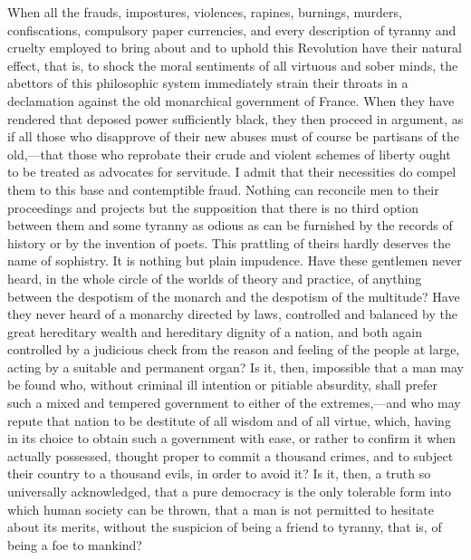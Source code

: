 When all the frauds, impostures, violences, rapines, burnings, murders, confiscations, compulsory paper currencies, and every description of tyranny and cruelty employed to bring about and to uphold this Revolution have their natural effect, that is, to shock the moral sentiments of all virtuous and sober minds, the abettors of this philosophic system immediately strain their throats in a declamation against the old monarchical government of France. When they have rendered that deposed power sufficiently black, they then proceed in argument, as if all those who disapprove of their new abuses must of course be partisans of the old,—that those who reprobate their crude and violent schemes of liberty ought to be treated as advocates for servitude. I admit that their necessities do compel them to this base and contemptible fraud. Nothing can reconcile men to their proceedings and projects but the supposition that there is no third option between them and some tyranny as odious as can be furnished by the records of history or by the invention of poets. This prattling of theirs hardly deserves the name of sophistry. It is nothing but plain impudence. Have these gentlemen never heard, in the whole circle of the worlds of theory and practice, of anything between the despotism of the monarch and the despotism of the multitude? Have they never heard of a monarchy directed by laws, controlled and balanced by the great hereditary wealth and hereditary dignity of a nation, and both again controlled by a judicious check from the reason and feeling of the people at large, acting by a suitable and permanent organ? Is it, then, impossible that a man may be found who, without criminal ill intention or pitiable absurdity, shall prefer such a mixed and tempered government to either of the extremes,—and who may repute that nation to be destitute of all wisdom and of all virtue, which, having in its choice to obtain such a government with ease, or rather to confirm it when actually possessed, thought proper to commit a thousand crimes, and to subject their country to a thousand evils, in order to avoid it? Is it, then, a truth so universally acknowledged, that a pure democracy is the only tolerable form into which human society can be thrown, that a man is not permitted to hesitate about its merits, without the suspicion of being a friend to tyranny, that is, of being a foe to mankind?

